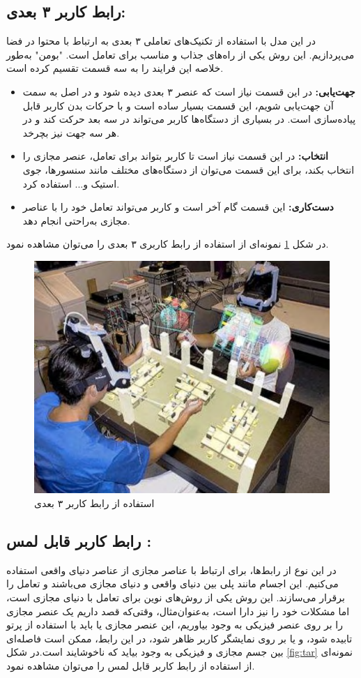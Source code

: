 \subsection{رابط کاربر ۳ بعدی\protect{}:}
در این مدل با استفاده از تکنیک‌های تعاملی ۳ بعدی به ارتباط با محتوا در فضا می‌پردازیم. این روش یکی از راه‌های جذاب و مناسب برای تعامل است. "بومن" به‌طور خلاصه این فرایند را به سه قسمت تقسیم کرده است\cite{Bowman}.
\begin{itemize}
	\item 
	\textbf{
		جهت‌یابی\protect{}: }در این قسمت نیاز است که عنصر ۳ بعدی دیده شود و در اصل به سمت آن جهت‌یابی شویم، این قسمت بسیار ساده است و با حرکات بدن کاربر قابل پیاده‌سازی است. در بسیاری از دستگاه‌ها کاربر می‌تواند در سه بعد حرکت کند و در هر سه جهت نیز بچرخد.
	\item 
	\textbf{
		انتخاب:} در این قسمت نیاز است تا کاربر بتواند برای تعامل، عنصر مجازی را انتخاب بکند، برای این قسمت می‌توان از دستگاه‌های مختلف مانند سنسورها، جوی استیک و... استفاده کرد.
	\item 
	\textbf{
		دست‌کاری:} این قسمت گام آخر است و کاربر می‌تواند تعامل خود را با عناصر مجازی به‌راحتی انجام دهد.
\end{itemize}
در شکل \ref{fig:Bowman} نمونه‌ای از استفاده از رابط کاربری ۳ بعدی را می‌توان مشاهده نمود.
\begin{figure}[tb]
	\centering
	\includegraphics[width=0.6\linewidth]{image/3d}
	\caption {استفاده از رابط کاربر ۳ بعدی \cite{Bowman}}
	\label{fig:Bowman}
\end{figure}
\subsection{رابط کاربر قابل‌ لمس\protect{} :}
در این نوع از رابط‌ها، برای ارتباط با عناصر مجازی از عناصر دنیای واقعی استفاده می‌کنیم. این اجسام مانند پلی بین دنیای واقعی و دنیای مجازی می‌باشند و تعامل را برقرار می‌سازند. این روش یکی از روش‌های نوین برای تعامل با دنیای مجازی است، اما مشکلات خود را نیز دارا است، به‌عنوان‌مثال، وقتی‌که قصد داریم یک عنصر مجازی را بر روی عنصر فیزیکی به وجود بیاوریم، این عنصر مجازی یا باید با استفاده از پرتو تابیده شود، و یا بر روی نمایشگر کاربر ظاهر شود، در این رابط، ممکن است فاصله‌ای بین جسم مجازی و فیزیکی به وجود بیاید که ناخوشایند است\cite{Kato}.در شکل \ref{fig:tar} نمونه‌ای از استفاده از رابط کاربر قابل لمس را می‌توان مشاهده نمود.

